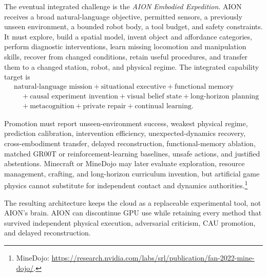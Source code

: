 The eventual integrated challenge is the \emph{AION Embodied Expedition}.  AION
receives a broad natural-language objective, permitted sensors, a previously
unseen environment, a bounded robot body, a tool budget, and safety constraints.
It must explore, build a spatial model, invent object and affordance categories,
perform diagnostic interventions, learn missing locomotion and manipulation
skills, recover from changed conditions, retain useful procedures, and transfer
them to a changed station, robot, and physical regime.  The integrated
capability target is
\begin{equation}
\label{eq:embodied-expedition-integration}
\begin{aligned}
&\text{natural-language mission}
+\text{situational executive}
+\text{functional memory}\nonumber\\
&\quad+\text{causal experiment invention}
+\text{visual belief state}
+\text{long-horizon planning}\nonumber\\
&\quad+\text{metacognition}
+\text{private repair}
+\text{continual learning}.
\end{aligned}
\end{equation}

Promotion must report unseen-environment success, weakest physical regime,
prediction calibration, intervention efficiency, unexpected-dynamics recovery,
cross-embodiment transfer, delayed reconstruction, functional-memory ablation,
matched GR00T or reinforcement-learning baselines, unsafe actions, and justified
abstentions.  Minecraft or MineDojo may later evaluate exploration, resource
management, crafting, and long-horizon curriculum invention, but artificial
game physics cannot substitute for independent contact and dynamics
authorities.\footnote{MineDojo:
\url{https://research.nvidia.com/labs/srl/publication/fan-2022-mine-dojo/}.}

The resulting architecture keeps the cloud as a replaceable experimental tool,
not AION's brain.  AION can discontinue GPU use while retaining every method
that survived independent physical execution, adversarial criticism, CAU
promotion, and delayed reconstruction.
